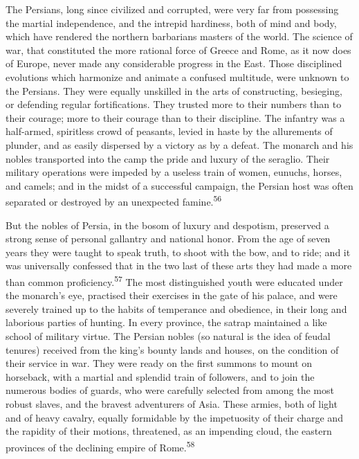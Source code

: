 The Persians, long since civilized and corrupted, were very far
from possessing the martial independence, and the intrepid
hardiness, both of mind and body, which have rendered the
northern barbarians masters of the world. The science of war,
that constituted the more rational force of Greece and Rome, as
it now does of Europe, never made any considerable progress in
the East. Those disciplined evolutions which harmonize and
animate a confused multitude, were unknown to the Persians. They
were equally unskilled in the arts of constructing, besieging, or
defending regular fortifications. They trusted more to their
numbers than to their courage; more to their courage than to
their discipline. The infantry was a half-armed, spiritless crowd
of peasants, levied in haste by the allurements of plunder, and
as easily dispersed by a victory as by a defeat. The monarch and
his nobles transported into the camp the pride and luxury of the
seraglio. Their military operations were impeded by a useless
train of women, eunuchs, horses, and camels; and in the midst of
a successful campaign, the Persian host was often separated or
destroyed by an unexpected famine.\textsuperscript{56}


But the nobles of Persia, in the bosom of luxury and despotism,
preserved a strong sense of personal gallantry and national
honor. From the age of seven years they were taught to speak
truth, to shoot with the bow, and to ride; and it was universally
confessed that in the two last of these arts they had made a more
than common proficiency.\textsuperscript{57} The most distinguished youth were
educated under the monarch’s eye, practised their exercises in
the gate of his palace, and were severely trained up to the
habits of temperance and obedience, in their long and laborious
parties of hunting. In every province, the satrap maintained a
like school of military virtue. The Persian nobles (so natural is
the idea of feudal tenures) received from the king’s bounty lands
and houses, on the condition of their service in war. They were
ready on the first summons to mount on horseback, with a martial
and splendid train of followers, and to join the numerous bodies
of guards, who were carefully selected from among the most robust
slaves, and the bravest adventurers of Asia. These armies, both
of light and of heavy cavalry, equally formidable by the
impetuosity of their charge and the rapidity of their motions,
threatened, as an impending cloud, the eastern provinces of the
declining empire of Rome.\textsuperscript{58}



